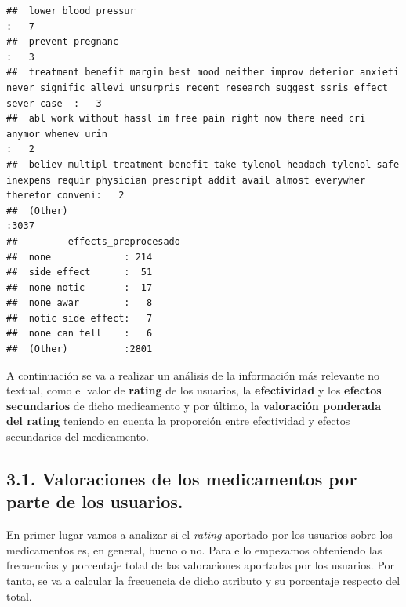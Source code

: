 \documentclass[spanish,]{article}
\newenvironment{Shaded}{\begin{snugshade}}{\end{snugshade}}
\newcommand{\KeywordTok}[1]{\textcolor[rgb]{0.13,0.29,0.53}{\textbf{#1}}}
\newcommand{\CommentTok}[1]{\textcolor[rgb]{0.56,0.35,0.01}{\textit{#1}}}
\newcommand{\OperatorTok}[1]{\textcolor[rgb]{0.81,0.36,0.00}{\textbf{#1}}}
\newcommand{\NormalTok}[1]{#1}
\begin{document}
\begin{verbatim}
##  lower blood pressur                                                                                                                                 :   7     
##  prevent pregnanc                                                                                                                                    :   3     
##  treatment benefit margin best mood neither improv deterior anxieti never signific allevi unsurpris recent research suggest ssris effect sever case  :   3     
##  abl work without hassl im free pain right now there need cri anymor whenev urin                                                                     :   2     
##  believ multipl treatment benefit take tylenol headach tylenol safe inexpens requir physician prescript addit avail almost everywher therefor conveni:   2     
##  (Other)                                                                                                                                             :3037     
##         effects_preprocesado
##  none             : 214     
##  side effect      :  51     
##  none notic       :  17     
##  none awar        :   8     
##  notic side effect:   7     
##  none can tell    :   6     
##  (Other)          :2801
\end{verbatim}

A continuación se va a realizar un análisis de la información más
relevante no textual, como el valor de \textbf{rating} de los usuarios,
la \textbf{efectividad} y los \textbf{efectos secundarios} de dicho
medicamento y por último, la \textbf{valoración ponderada del rating}
teniendo en cuenta la proporción entre efectividad y efectos secundarios
del medicamento.

\subsection{3.1. Valoraciones de los medicamentos por parte de los
usuarios.}\label{valoraciones-de-los-medicamentos-por-parte-de-los-usuarios.}

En primer lugar vamos a analizar si el \emph{rating} aportado por los
usuarios sobre los medicamentos es, en general, bueno o no. Para ello
empezamos obteniendo las frecuencias y porcentaje total de las
valoraciones aportadas por los usuarios. Por tanto, se va a calcular la
frecuencia de dicho atributo y su porcentaje respecto del total.

\begin{Shaded}
\end{Shaded}
\end{document}
